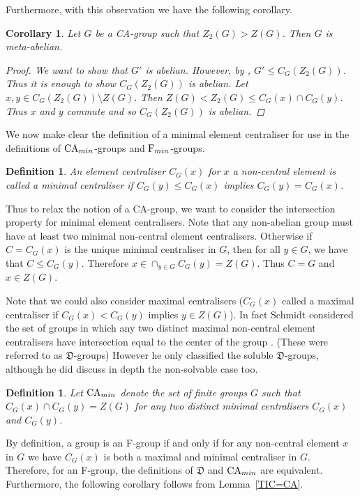 \documentclass[a4paper,11pt]{article}
\theoremstyle{plain}
\newtheorem{cor}[thm]{Corollary}
\newtheorem{df}[thm]{Definition}
\numberwithin{thm}{section}
\begin{document}
Furthermore, with this observation we have the following corollary.
\begin{cor}
Let $G$ be a CA-group such that $Z_2(G)>Z(G)$.
Then $G$ is meta-abelian.
\begin{proof}
We want to show that $G'$ is abelian.
However, by \cite[Theorem III.2.11]{Huppert}, $G'\leq C_G(Z_2(G))$.
Thus it is enough to show $C_G(Z_2(G))$ is abelian.
Let $x,y\in C_G(Z_2(G))\setminus Z(G)$.
Then $Z(G)<Z_2(G)\leq C_G(x)\cap C_G(y)$.
Thus $x$ and $y$ commute and so $C_G(Z_2(G))$ is abelian.
 
\end{proof}
\end{cor}

We now make clear the definition of a minimal element centraliser for use in the definitions of ${\rm CA}_{min}$-groups and ${\rm F}_{min}$-groups.

\begin{df}
An element centraliser $C_G(x)$ for $x$ a non-central element is called a minimal centraliser if $C_G(y)\leq C_G(x)$ implies $C_G(y)=C_G(x)$.
\end{df}

Thus to relax the notion of a CA-group, we want to consider the intersection property for minimal element centralisers.
Note that any non-abelian group must have at least two minimal non-central element centralisers.
Otherwise if $C=C_G(x)$ is the unique minimal centraliser in $G$, then for all $y\in G$, we have that $C\leq C_G(y)$.
Therefore $x\in \cap_{y\in G} C_G(y)=Z(G)$.
Thus $C=G$ and $x\in Z(G)$.

Note that we could also consider maximal centralisers ($C_G(x)$ called a maximal centraliser if $C_G(x)<C_G(y)$ implies $y\in Z(G)$).
In fact Schmidt considered the set of groups in which any two distinct maximal non-central element centralisers have intersection equal to the center of the group \cite{SchmidtCaGps}. (These were referred to as $\mathfrak{D}$-groups)
However he only classified the soluble $\mathfrak{D}$-groups, although he did discuss in depth the non-solvable case too.

\begin{df}
Let ${\rm CA}_{min}$ denote the set of finite groups $G$ such that $C_G(x)\cap C_G(y)=Z(G)$ for any two distinct minimal centralisers $C_G(x)$ and $C_G(y)$. 
\end{df}

By definition, a group is an F-group if and only if for any non-central element $x$ in $G$ we have $C_G(x)$ is both a maximal and minimal centraliser in $G$. 
Therefore, for an F-group, the definitions of $\mathfrak{D}$ and ${\rm CA}_{min}$ are equivalent.
Furthermore, the following corollary follows from Lemma~\ref{TIC=CA}.
\end{document}
